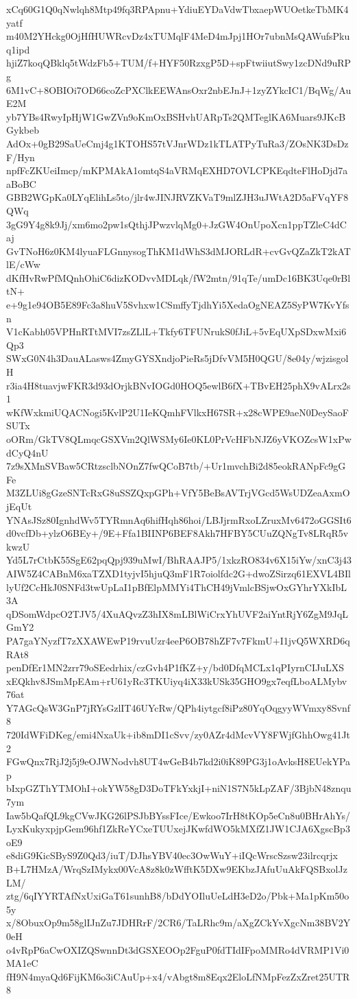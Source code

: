 xCq60G1Q0qNwlqh8Mtp49fq3RPApnu+YdiuEYDaVdwTbxaepWUOetkeTbMK4yatf
m40M2YHckg0OjHfHUWRcvDz4xTUMqlF4MeD4mJpj1HOr7ubnMsQAWufsPkuq1ipd
hjiZ7koqQBklq5tWdzFb5+TUM/f+HYF50RzxgP5D+spFtwiiutSwy1zcDNd9uRPg
6M1vC+8OBIOi7OD66coZcPXClkEEWAnsOxr2nbEJnJ+1zyZYkcIC1/BqWg/AuE2M
yb7YBs4RwyIpHjW1GwZVn9oKmOxBSHvhUARpTs2QMTeglKA6Muars9JKcBGykbeb
AdOx+0gB29SaUeCmj4g1KTOHS57tVJnrWDz1kTLATPyTuRa3/ZOsNK3DsDzF/Hyn
npfFcZKUeiImcp/mKPMAkA1omtqS4aVRMqEXHD7OVLCPKEqdteFlHoDjd7aaBoBC
GBB2WGpKa0LYqElihLs5to/jlr4wJINJRVZKVaT9mlZJH3uJWtA2D5aFVqYF8QWq
3gG9Y4g8k9Jj/xm6mo2pw1sQthjJPwzvlqMg0+JzGW4OnUpoXcn1ppTZleC4dCaj
GvTNoH6z0KM4lyuaFLGnnysogThKM1dWhS3dMJORLdR+cvGvQZaZkT2kATlE/cWw
dKfHvRwPfMQnhOhiC6dizKODvvMDLqk/fW2mtn/91qTe/umDc16BK3Uqe0rBltN+
e+9g1e94OB5E89Fc3a8huV5Svhxw1CSmffyTjdhYi5XedaOgNEAZ5SyPW7KvYfsn
V1cKabh05VPHnRTtMVI7zsZLlL+Tkfy6TFUNrukS0fJiL+5vEqUXpSDxwMxi6Qp3
SWxG0N4h3DauALasws4ZmyGYSXndjoPieRs5jDfvVM5H0QGU/8e04y/wjzisgolH
r3ia4H8tuavjwFKR3d93dOrjkBNvIOGd0HOQ5ewlB6fX+TBvEH25phX9vALrx2s1
wKfWxkmiUQACNogi5KvlP2U1IeKQmhFVlkxH67SR+x28cWPE9aeN0DeySaoFSUTx
oORm/GkTV8QLmqcGSXVm2QlWSMy6Ie0KL0PrVcHFbNJZ6yVKOZcsW1xPwdCyQ4nU
7z9sXMnSVBaw5CRtzsclbNOnZ7fwQCoB7tb/+Ur1mvchBi2d85eokRANpFc9gGFe
M3ZLUi8gGzeSNTcRxG8uSSZQxpGPh+VfY5BeBsAVTrjVGcd5WsUDZeaAxmOjEqUt
YNAsJSz80IgnhdWv5TYRmnAq6hifHqh86hoi/LBJjrmRxoLZruxMv6472oGGSIt6
d0vcfDb+ylzO6BEy+/9E+Ffa1BIINP6BEF8Akh7HFBY5CUuZQNgTv8LRqR5vkwzU
Yd5L7rCtbK55SgE62pqQpj939uMwI/BhRAAJP5/1xkzRO834v6X15iYw/xnC3j43
AIW5Z4CABnM6xaTZXD1tyjvI5hjuQ3mF1R7oiolfdc2G+dwoZSirzq61EXVL4BIl
lyUf2CcHkJ0SNFd3twUpLaI1pBfElpMMYi4ThCH49jVmlcBSjwOxGYhrYXkIbL3A
qDSomWdpcO2TJV5/4XuAQvzZ3hIX8mLBlWiCrxYhUVF2aiYntRjY6ZgM9JqLGmY2
PA7gaYNyzfT7zXXAWEwP19rvuUzr4eeP6OB78hZF7v7FkmU+I1jvQ5WXRD6qRAt8
penDfEr1MN2zrr79oSEedrhix/czGvh4P1fKZ+y/bd0DfqMCLx1qPIyrnCIJuLXS
xEQkhv8JSmMpEAm+rU61yRc3TKUiyq4iX33kUSk35GHO9gx7eqfLboALMybv76at
Y7AGcQsW3GnP7jRYsGzlIT46UYcRw/QPh4iytgcf8iPz80YqOqgyyWVmxy8Svnf8
720IdWFiDKeg/emi4NxaUk+ib8mDI1cSvv/zy0AZr4dMcvVY8FWjfGhhOwg41Jt2
FGwQnx7RjJ2j5j9eOJWNodvh8UT4wGeB4b7kd2i0iK89PG3j1oAvksH8EUekYPap
bIxpGZThYTMOhI+okYW58gD3DoTFkYxkjI+niN1S7N5kLpZAF/3BjbN48znqu7ym
Iaw5bQafQL9kgCVwJKG26lPSJbBYssFIce/Ewkoo7IrH8tKOp5eCn8u0BHrAhYs/
LyxKukyxpjpGem96hf1ZkReYCxeTUUxejJKwfdWO5kMXfZ1JW1CJA6XgscBp3oE9
e8diG9KicSByS9Z0Qd3/iuT/DJhsYBV40ec3OwWuY+iIQcWrscSzsw23ilrcqrjx
B+L7HMzA/WrqSzIMykx00VcA8z8k0zWfftK5DXw9EKbzJAfuUuAkFQSBxolJzLM/
ztg/6qIYYRTAfNxUxiGaT61sunhB8/bDdYOIluUeLdH3eD2o/Pbk+Ma1pKm50o5y
x/8ObuxOp9m58glIJnZu7JDHRrF/2CR6/TaLRhc9m/aXgZCkYvXgcNm38BV2Y0eH
o4vRpP6aCwOXIZQSwnnDt3dGSXEOOp2FguP0fdTIdIFpoMMRo4dVRMP1Vi0MA1eC
fH9N4myaQd6FijKM6o3iCAuUp+x4/vAbgt8m8Eqx2EloLfNMpFezZxZret25UTR8
